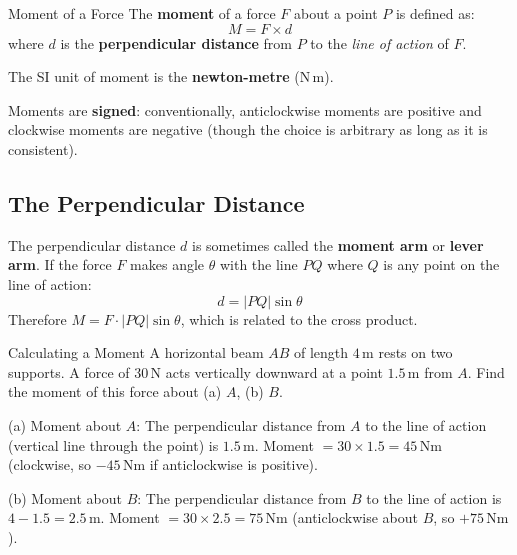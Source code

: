 \documentclass[12pt, a4paper]{book}
\newcommand{\Nm}{\,\mathrm{Nm}}
\newcommand{\m}{\,\mathrm{m}}
\newcommand{\N}{\,\mathrm{N}}
\begin{document}
\begin{defn}{Moment of a Force}{}
The \textbf{moment} of a force $F$ about a point $P$ is defined as:
\[
  M = F \times d
\]
where $d$ is the \textbf{perpendicular distance} from $P$ to the \emph{line of action} of $F$.

The SI unit of moment is the \textbf{newton-metre} ($\mathrm{N\,m}$).

Moments are \textbf{signed}: conventionally, anticlockwise moments are positive and clockwise moments are negative (though the choice is arbitrary as long as it is consistent).
\end{defn}

\begin{center}
\end{center}

\subsection{The Perpendicular Distance}

The perpendicular distance $d$ is sometimes called the \textbf{moment arm} or \textbf{lever arm}. If the force $F$ makes angle $\theta$ with the line $PQ$ where $Q$ is any point on the line of action:
\[
  d = |PQ|\sin\theta
\]
Therefore $M = F \cdot |PQ|\sin\theta$, which is related to the cross product.

\begin{exmp}{Calculating a Moment}{}
A horizontal beam $AB$ of length $4\m$ rests on two supports. A force of $30\N$ acts vertically downward at a point $1.5\m$ from $A$. Find the moment of this force about (a) $A$, (b) $B$.

\medskip
(a) Moment about $A$: The perpendicular distance from $A$ to the line of action (vertical line through the point) is $1.5\m$. Moment $= 30 \times 1.5 = 45\Nm$ (clockwise, so $-45\Nm$ if anticlockwise is positive).

(b) Moment about $B$: The perpendicular distance from $B$ to the line of action is $4 - 1.5 = 2.5\m$. Moment $= 30 \times 2.5 = 75\Nm$ (anticlockwise about $B$, so $+75\Nm$).
\end{exmp}
\end{document}
